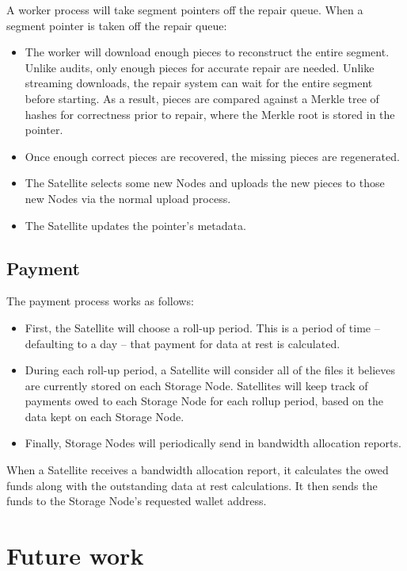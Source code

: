 \documentclass[8pt,fleqn,openany]{book}
\begin{document}
A worker process will take segment pointers off the repair queue.
When a segment pointer is taken off the repair queue:

\begin{itemize}
\item The worker will download enough pieces to reconstruct the entire segment.
  Unlike audits, only enough pieces for accurate repair are needed.
  Unlike streaming downloads, the repair system can wait for the entire segment
  before starting. As a result, pieces are compared against a Merkle tree of
  hashes for correctness prior to repair, where the Merkle root is stored in
  the pointer.
\item Once enough correct pieces are recovered, the missing pieces are
  regenerated.
\item The Satellite selects some new Nodes and uploads the new pieces to
  those new Nodes via the normal upload process.
\item The Satellite updates the pointer's metadata.
\end{itemize}

\section{Payment}

The payment process works as follows:

\begin{itemize}
\item First, the Satellite will choose a roll-up period. This is a period of
  time -- defaulting to a day -- that payment for data at rest is calculated.
\item During each roll-up period, a Satellite will consider all of the files it
  believes are currently stored on each Storage Node. Satellites will keep track
of payments owed to each Storage Node for each rollup period, based on
the data kept on each Storage Node.
\item Finally, Storage Nodes will periodically send in bandwidth allocation reports.
\end{itemize}

When a
  Satellite receives a bandwidth allocation report, it calculates the owed
  funds along with the outstanding data at rest calculations. It then sends the
  funds to the Storage Node's requested wallet address.

\chapter{Future work}\label{chap:future-work}
\end{document}

